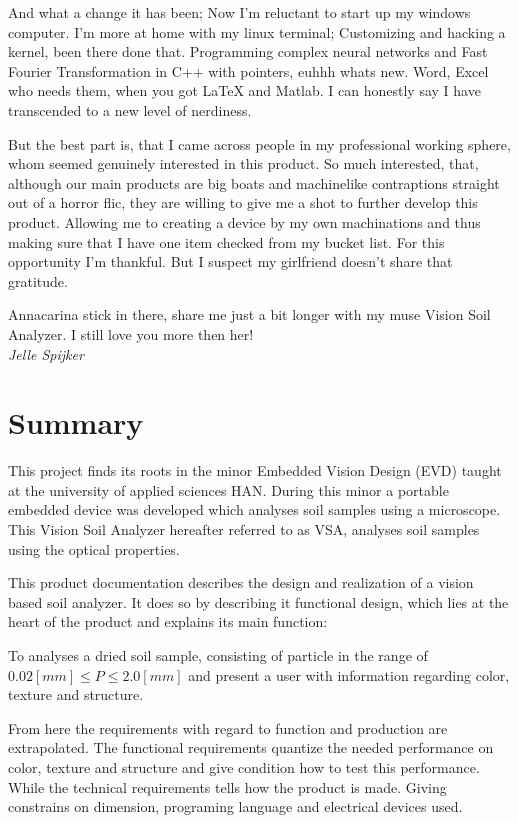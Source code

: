 \documentclass[11pt,fleqn,,a4paper,twoside,openright]{book}
\begin{document}
And what a change it has been; Now I'm reluctant to start up my windows computer. I'm more at home with my linux terminal; Customizing and hacking a kernel, been there done that. Programming complex neural networks and Fast Fourier Transformation in C++ with pointers, euhhh whats new. Word, Excel who needs them, when you got \LaTeX\xspace and Matlab. I can honestly say I have transcended to a new level of nerdiness.

But the best part is, that I came across people in my professional working sphere, whom seemed genuinely interested in this product. So much interested, that, although our main products are big boats and machinelike contraptions straight out of a horror flic, they are willing to give me a shot to further develop this product. Allowing me to creating a device by my own machinations and thus making sure that I have one item checked from my bucket list. For this opportunity I'm thankful. But I suspect my girlfriend doesn't share that gratitude.
\\
\begin{center}
	Annacarina stick in there, share me just a bit longer with my muse Vision Soil Analyzer. I still love you more then her!\\
	\textit{Jelle Spijker}
\end{center}

\chapter*{Summary}
This project finds its roots in the minor Embedded Vision Design (EVD) taught at the university of applied sciences HAN. During this minor a portable embedded device was developed which analyses soil samples using a microscope. This Vision Soil Analyzer hereafter referred to as VSA, analyses soil samples using the optical properties.

This product documentation describes the design and realization of a vision based soil analyzer. It does so by describing it functional design, which lies at the heart of the product and explains its main function:
\begin{sBox}
	To analyses a dried soil sample, consisting of particle in the range of $ 0.02 [mm] \leq P \leq 2.0 [mm] $ and present a user with information regarding color, texture and structure.
\end{sBox}
From here the requirements with regard to function and production are extrapolated. The functional requirements quantize the needed performance on color, texture and structure and give condition how to test this performance. While the technical requirements tells how the product is made. Giving constrains on dimension, programing language and electrical devices used.
\end{document}
